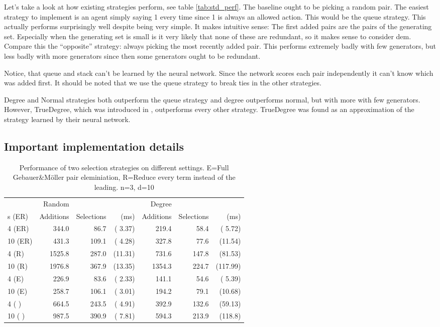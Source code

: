 \documentclass{article}
\theoremstyle{changedot}
\theoremstyle{changedotbreak}
\theoremstyle{nonumberplain}
\begin{document}
Let's take a look at how existing strategies perform, see table \ref{tab:std_perf}. The baseline ought to be picking a random pair. The easiest strategy to implement is an agent simply saying 1 every time since 1 is always an allowed action. This would be the queue strategy. This actually performs surprisingly well despite being very simple. It makes intuitive sense: The first added pairs are the pairs of the generating set. Especially when the generating set is small is it very likely that none of these are redundant, so it makes sense to consider dem. Compare this the ``opposite'' strategy: always picking the most recently added pair. This performs extremely badly with few generators, but less badly with more generators since then some generators ought to be redundant.

Notice, that queue and stack can't be learned by the neural network. Since the network scores each pair independently it can't know which was added first. It should be noted that we use the queue strategy to break ties in the other strategies.

Degree and Normal strategies both outperform the queue strategy and degree outperforms normal, but with more with few generators. However, TrueDegree, which was introduced in \cite{peifer}, outperforms every other strategy. TrueDegree was found as an approximation of the strategy learned by their neural network. 

\subsection{Important implementation details}
\begin{table}[h]
  \begin{tabular}{l|rrr|rrr}
                 & Random & &             & Degree & & \\
    s   (ER) & Additions & Selections & (ms) & Additions & Selections & (ms) \\ \hline
    4 \hfill  (ER) &  344.0& 86.7 & ( 3.37) &  219.4& 58.4 & ( 5.72) \\
    10 \hfill  (ER) &  431.3&109.1 & ( 4.28) &  327.8& 77.6 & (11.54) \\
    4 \hfill   (R) & 1525.8&287.0 & (11.31) &  731.6&147.8 & (81.53) \\
    10 \hfill  (R) & 1976.8&367.9 & (13.35) & 1354.3&224.7 & (117.99) \\
    4 \hfill   (E) &  226.9& 83.6 & ( 2.33) &  141.1& 54.6 & ( 5.39) \\
    10 \hfill  (E) &  258.7&106.1 & ( 3.01) &  194.2& 79.1 & (10.68) \\
    4 \hfill   (  ) &  664.5&243.5 & ( 4.91) &  392.9&132.6 & (59.13) \\
    10 \hfill  (  ) &  987.5&390.9 & ( 7.81) &  594.3&213.9 & (118.8)
  \end{tabular}
  \caption{Performance of two selection strategies on different settings. E=Full Gebauer\&Möller pair eleminiation, R=Reduce every term instead of the leading. n=3, d=10}
  \label{tab:imp_details}
\end{table}
\end{document}
